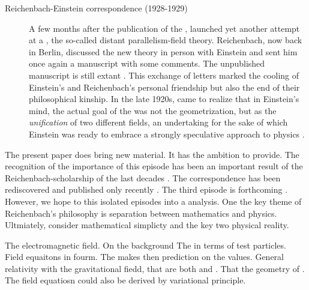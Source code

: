 \documentclass[draft]{article}
\newcommand{\PRZL}{\citetitle{Reichenbach1928}\xspace}
\newcommand{\DP}{distant parallelism\xspace}
\begin{document}
\begin{description}
\item[Reichenbach-Einstein correspondence (1928-1929)]\label{reichenbacheinsteinII}   A few months after the publication of the \PRZL \citep{Reichenbach1928}, \citet{Einstein19281,Einstein19282} launched yet another attempt at a \uft, the so-called \DP-field theory. Reichenbach, now back in Berlin, discussed the new theory in person with Einstein and sent him once again a manuscript with some comments. The unpublished manuscript is still extant \citep{Reichenbach1928b}. This exchange of letters marked the cooling of Einstein's and Reichenbach's personal friendship but also the end of their philosophical kinship. In the late 1920s, \citet{Reichenbach1929a,Reichenbach1929b,Reichenbach1929c} came to realize that in Einstein's mind, the actual goal of the \uftp was not the geometrization, but as the \emph{unification} of two different fields, an undertaking for the sake of which Einstein was ready to embrace a strongly speculative approach to physics \citep{Dongen2010}.  
\end{description}

The present paper does bring new material. It has the ambition to provide. The recognition of the importance of this episode has been an important result of the Reichenbach-scholarship of the last decades \citep{Ryckman1995,Ryckman1996}. The correspondence has been rediscovered and published \citep[]{CPAE} only recently \citep{Giovanelli2016d}. The third episode is forthcoming \citep{Giovanelli2022}. However, we hope to this isolated episodes into a analysis. One the key theme of Reichenbach's philosophy is separation between mathematics and physics. Ultmiately, consider mathematical simplicty and the key two physical reality.


The electromagnetic field. On the background The in terms of test particles. Field equaitons in fourm. The makes then prediction on the values. General relativity \gmn with the gravitational fiedd, that are both and \rac. That the geometry of \spti. The field equatiosn could also be derived by variational principle. 
\end{document}
